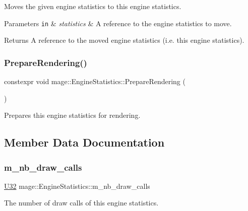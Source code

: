 Moves the given engine statistics to this engine statistics.


\begin{DoxyParams}[1]{Parameters}
\mbox{\tt in}  & {\em statistics} & A reference to the engine statistics to move. \\
\hline
\end{DoxyParams}
\begin{DoxyReturn}{Returns}
A reference to the moved engine statistics (i.\+e. this engine statistics). 
\end{DoxyReturn}
\hypertarget{classmage_1_1_engine_statistics_a15eaca9bc77798a83e9c1a51fe6c7933}{}\label{classmage_1_1_engine_statistics_a15eaca9bc77798a83e9c1a51fe6c7933} 
\subsubsection{\texorpdfstring{Prepare\+Rendering()}{PrepareRendering()}}
{\footnotesize\ttfamily constexpr void mage\+::\+Engine\+Statistics\+::\+Prepare\+Rendering (\begin{DoxyParamCaption}{ }\end{DoxyParamCaption})\hspace{0.3cm}{\ttfamily [noexcept]}}

Prepares this engine statistics for rendering. 

\subsection{Member Data Documentation}
\hypertarget{classmage_1_1_engine_statistics_a26eeba872cebff2657b8b023751b1894}{}\label{classmage_1_1_engine_statistics_a26eeba872cebff2657b8b023751b1894} 
\subsubsection{\texorpdfstring{m\+\_\+nb\+\_\+draw\+\_\+calls}{m\_nb\_draw\_calls}}
{\footnotesize\ttfamily \hyperlink{namespacemage_a41c104c036fba3756a74e19f793eeaa1}{U32} mage\+::\+Engine\+Statistics\+::m\+\_\+nb\+\_\+draw\+\_\+calls\hspace{0.3cm}{\ttfamily [private]}}

The number of draw calls of this engine statistics. 